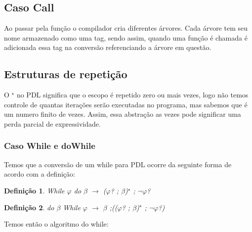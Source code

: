 \documentclass{article}
\newcommand\bruno[1]{({\color{red}#1})}
\newtheorem{definicao}{Definição}
\begin{document}
	\subsection{Caso Call}
	\BlankLine
	Ao passar pela função o compilador cria diferentes árvores. Cada árvore tem seu nome armazenado como uma tag, sendo assim, quando uma função é chamada é adicionada essa tag na conversão referenciando a árvore em questão.	 
	
	
	\subsection{Estruturas de repetição} %
	O $^\star$ no PDL significa que o escopo é repetido zero ou mais vezes, logo não temos controle de quantas iterações serão executadas no programa, mas sabemos que é um numero finito de vezes. Assim, essa abstração as vezes pode significar uma perda parcial de expressividade.\\
	\subsubsection{Caso While e doWhile}
	Temos que a conversão de um while para PDL ocorre da seguinte forma de acordo com a definição:\\
	
	\begin{definicao}
		While $\varphi$ do $\beta$ $\rightarrow$ ($\varphi$? ; $\beta$)$^\star$ ; $\neg$$\varphi$?
	\end{definicao}
	
	\begin{definicao}
		do $\beta$ While $\varphi$ $\rightarrow$  $\beta$ ;(($\varphi$? ; $\beta$)$^\star$ ; $\neg$$\varphi$?)
	\end{definicao}
	Temos então o algoritmo do while:\\
	
\end{document}
